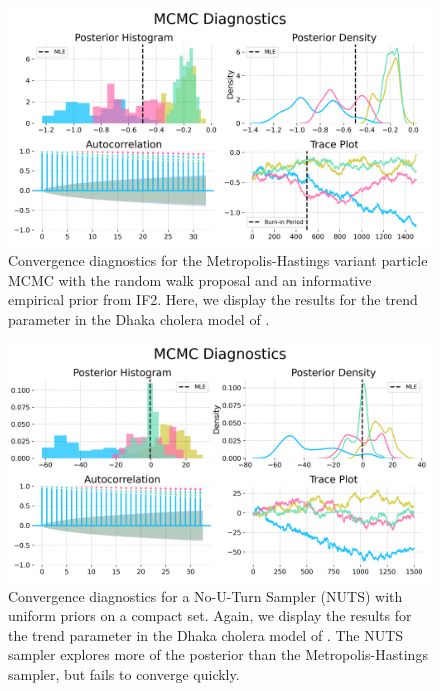 
\begin{figure}[H]
    \centering
    \includegraphics[width=\textwidth/\real{1.25}]{imgs/pmcmc/mh.png}
    \caption{Convergence diagnostics for the Metropolis-Hastings variant particle MCMC with the random walk proposal and an informative empirical prior from IF2. Here, we display the results for the trend parameter in the Dhaka cholera model of \cite{king08}.}
    \label{fig:mh}
\end{figure}
\FloatBarrier
\newpage

\begin{figure}[H]
    \centering
    \includegraphics[width=\textwidth/\real{1.25}]{imgs/pmcmc/nuts.png}
    \caption{Convergence diagnostics for a No-U-Turn Sampler (NUTS) with uniform priors on a compact set. Again, we display the results for the trend parameter in the Dhaka cholera model of \cite{king08}. The NUTS sampler explores more of the posterior than the Metropolis-Hastings sampler, but fails to converge quickly.}
    \label{fig:nuts}
\end{figure}
\FloatBarrier
\newpage

